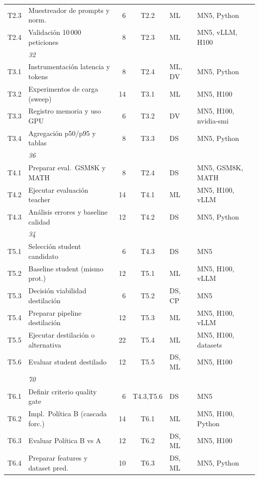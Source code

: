 \documentclass[11pt,a4paper]{article}
\begin{document}
{\begin{tabularx}{\textwidth}{>{\ttfamily}l >{\raggedright\arraybackslash}p{4.5cm} r c >{\raggedright\arraybackslash}p{1.1cm} >{\raggedright\arraybackslash}X}
T2.3 & Muestreador de prompts y norm. & 6 & T2.2 & ML & MN5, Python \\
T2.4 & Validación 10\,000 peticiones & 8 & T2.3 & ML & MN5, vLLM, H100 \\
\multicolumn{2}{r}{\textit{Subtotal F2}} & \textit{32} & & & \\
\addlinespace[2pt]
T3.1 & Instrumentación latencia y tokens & 8 & T2.4 & ML, DV & MN5, Python \\
T3.2 & Experimentos de carga (sweep) & 14 & T3.1 & ML & MN5, H100 \\
T3.3 & Registro memoria y uso GPU & 6 & T3.2 & DV & MN5, H100, nvidia-smi \\
T3.4 & Agregación p50/p95 y tablas & 8 & T3.3 & DS & MN5, Python \\
\multicolumn{2}{r}{\textit{Subtotal F3}} & \textit{36} & & & \\
\addlinespace[2pt]
T4.1 & Preparar eval.\ GSM8K y MATH & 8 & T2.4 & DS & MN5, GSM8K, MATH \\
T4.2 & Ejecutar evaluación teacher & 14 & T4.1 & ML & MN5, H100, vLLM \\
T4.3 & Análisis errores y baseline calidad & 12 & T4.2 & DS & MN5, Python \\
\multicolumn{2}{r}{\textit{Subtotal F4}} & \textit{34} & & & \\
\addlinespace[2pt]
T5.1 & Selección student candidato & 6 & T4.3 & DS & MN5 \\
T5.2 & Baseline student (mismo prot.) & 12 & T5.1 & ML & MN5, H100, vLLM \\
T5.3 & Decisión viabilidad destilación & 6 & T5.2 & DS, CP & MN5 \\
T5.4 & Preparar pipeline destilación & 12 & T5.3 & ML & MN5, H100, vLLM \\
T5.5 & Ejecutar destilación o alternativa & 22 & T5.4 & ML & MN5, H100, datasets \\
T5.6 & Evaluar student destilado & 12 & T5.5 & DS, ML & MN5, H100 \\
\multicolumn{2}{r}{\textit{Subtotal F5}} & \textit{70} & & & \\
\addlinespace[2pt]
T6.1 & Definir criterio quality gate & 6 & T4.3,T5.6 & DS & MN5 \\
T6.2 & Impl.\ Política B (cascada forc.) & 14 & T6.1 & ML & MN5, H100, Python \\
T6.3 & Evaluar Política B vs A & 12 & T6.2 & DS, ML & MN5, H100 \\
T6.4 & Preparar features y dataset pred. & 10 & T6.3 & DS, ML & MN5, Python \\

\end{tabularx}}
\end{document}
